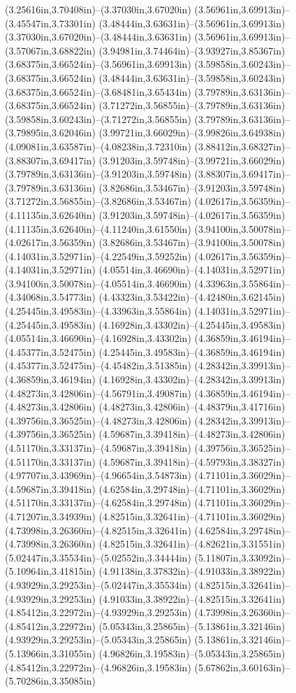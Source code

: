 (3.25616in,3.70408in)--(3.37030in,3.67020in) (3.56961in,3.69913in)--(3.45547in,3.73301in) (3.48444in,3.63631in)--(3.56961in,3.69913in) (3.37030in,3.67020in)--(3.48444in,3.63631in) (3.56961in,3.69913in)--(3.57067in,3.68822in) (3.94981in,3.74464in)--(3.93927in,3.85367in) (3.68375in,3.66524in)--(3.56961in,3.69913in) (3.59858in,3.60243in)--(3.68375in,3.66524in) (3.48444in,3.63631in)--(3.59858in,3.60243in) (3.68375in,3.66524in)--(3.68481in,3.65434in) (3.79789in,3.63136in)--(3.68375in,3.66524in) (3.71272in,3.56855in)--(3.79789in,3.63136in) (3.59858in,3.60243in)--(3.71272in,3.56855in) (3.79789in,3.63136in)--(3.79895in,3.62046in) (3.99721in,3.66029in)--(3.99826in,3.64938in) (4.09081in,3.63587in)--(4.08238in,3.72310in) (3.88412in,3.68327in)--(3.88307in,3.69417in) (3.91203in,3.59748in)--(3.99721in,3.66029in) (3.79789in,3.63136in)--(3.91203in,3.59748in) (3.88307in,3.69417in)--(3.79789in,3.63136in) (3.82686in,3.53467in)--(3.91203in,3.59748in) (3.71272in,3.56855in)--(3.82686in,3.53467in) (4.02617in,3.56359in)--(4.11135in,3.62640in) (3.91203in,3.59748in)--(4.02617in,3.56359in) (4.11135in,3.62640in)--(4.11240in,3.61550in) (3.94100in,3.50078in)--(4.02617in,3.56359in) (3.82686in,3.53467in)--(3.94100in,3.50078in) (4.14031in,3.52971in)--(4.22549in,3.59252in) (4.02617in,3.56359in)--(4.14031in,3.52971in) (4.05514in,3.46690in)--(4.14031in,3.52971in) (3.94100in,3.50078in)--(4.05514in,3.46690in) (4.33963in,3.55864in)--(4.34068in,3.54773in) (4.43323in,3.53422in)--(4.42480in,3.62145in) (4.25445in,3.49583in)--(4.33963in,3.55864in) (4.14031in,3.52971in)--(4.25445in,3.49583in) (4.16928in,3.43302in)--(4.25445in,3.49583in) (4.05514in,3.46690in)--(4.16928in,3.43302in) (4.36859in,3.46194in)--(4.45377in,3.52475in) (4.25445in,3.49583in)--(4.36859in,3.46194in) (4.45377in,3.52475in)--(4.45482in,3.51385in) (4.28342in,3.39913in)--(4.36859in,3.46194in) (4.16928in,3.43302in)--(4.28342in,3.39913in) (4.48273in,3.42806in)--(4.56791in,3.49087in) (4.36859in,3.46194in)--(4.48273in,3.42806in) (4.48273in,3.42806in)--(4.48379in,3.41716in) (4.39756in,3.36525in)--(4.48273in,3.42806in) (4.28342in,3.39913in)--(4.39756in,3.36525in) (4.59687in,3.39418in)--(4.48273in,3.42806in) (4.51170in,3.33137in)--(4.59687in,3.39418in) (4.39756in,3.36525in)--(4.51170in,3.33137in) (4.59687in,3.39418in)--(4.59793in,3.38327in) (4.97707in,3.43969in)--(4.96654in,3.54873in) (4.71101in,3.36029in)--(4.59687in,3.39418in) (4.62584in,3.29748in)--(4.71101in,3.36029in) (4.51170in,3.33137in)--(4.62584in,3.29748in) (4.71101in,3.36029in)--(4.71207in,3.34939in) (4.82515in,3.32641in)--(4.71101in,3.36029in) (4.73998in,3.26360in)--(4.82515in,3.32641in) (4.62584in,3.29748in)--(4.73998in,3.26360in) (4.82515in,3.32641in)--(4.82621in,3.31551in) (5.02447in,3.35534in)--(5.02552in,3.34444in) (5.11807in,3.33092in)--(5.10964in,3.41815in) (4.91138in,3.37832in)--(4.91033in,3.38922in) (4.93929in,3.29253in)--(5.02447in,3.35534in) (4.82515in,3.32641in)--(4.93929in,3.29253in) (4.91033in,3.38922in)--(4.82515in,3.32641in) (4.85412in,3.22972in)--(4.93929in,3.29253in) (4.73998in,3.26360in)--(4.85412in,3.22972in) (5.05343in,3.25865in)--(5.13861in,3.32146in) (4.93929in,3.29253in)--(5.05343in,3.25865in) (5.13861in,3.32146in)--(5.13966in,3.31055in) (4.96826in,3.19583in)--(5.05343in,3.25865in) (4.85412in,3.22972in)--(4.96826in,3.19583in) (5.67862in,3.60163in)--(5.70286in,3.35085in) 